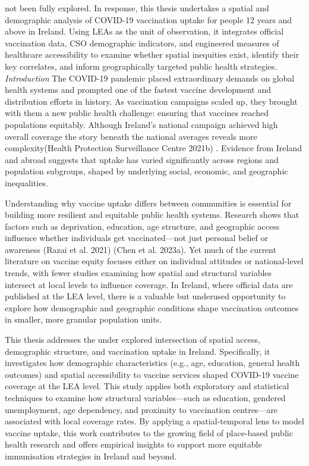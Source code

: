 \documentclass{article}
\begin{document}
not been fully explored. In response, this thesis undertakes a spatial
and demographic analysis of COVID-19 vaccination uptake for people 12
years and above in Ireland. Using LEAs as the unit of observation, it
integrates official vaccination data, CSO demographic indicators, and
engineered measures of healthcare accessibility to examine whether
spatial inequities exist, identify their key correlates, and inform
geographically targeted public health strategies. \emph{Introduction}
The COVID-19 pandemic placed extraordinary demands on global health
systems and prompted one of the fastest vaccine development and
distribution efforts in history. As vaccination campaigns scaled up,
they brought with them a new public health challenge: ensuring that
vaccines reached populations equitably. Although Ireland's national
campaign achieved high overall coverage the story beneath the national
averages reveals more complexity(Health Protection Surveillance Centre
2021b) . Evidence from Ireland and abroad suggests that uptake has
varied significantly across regions and population subgroups, shaped by
underlying social, economic, and geographic inequalities.

Understanding why vaccine uptake differs between communities is
essential for building more resilient and equitable public health
systems. Research shows that factors such as deprivation, education, age
structure, and geographic access influence whether individuals get
vaccinated---not just personal belief or awareness (Razai et al. 2021)
(Chen et al. 2023a). Yet much of the current literature on vaccine
equity focuses either on individual attitudes or national-level trends,
with fewer studies examining how spatial and structural variables
intersect at local levels to influence coverage. In Ireland, where
official data are published at the LEA level, there is a valuable but
underused opportunity to explore how demographic and geographic
conditions shape vaccination outcomes in smaller, more granular
population units.

This thesis addresses the under explored intersection of spatial access,
demographic structure, and vaccination uptake in Ireland. Specifically,
it investigates how demographic characteristics (e.g., age, education,
general health outcomes) and spatial accessibility to vaccine services
shaped COVID-19 vaccine coverage at the LEA level. This study applies
both exploratory and statistical techniques to examine how structural
variables---such as education, gendered unemployment, age dependency,
and proximity to vaccination centres---are associated with local
coverage rates. By applying a spatial-temporal lens to model vaccine
uptake, this work contributes to the growing field of place-based public
health research and offers empirical insights to support more equitable
immunisation strategies in Ireland and beyond.
\end{document}

